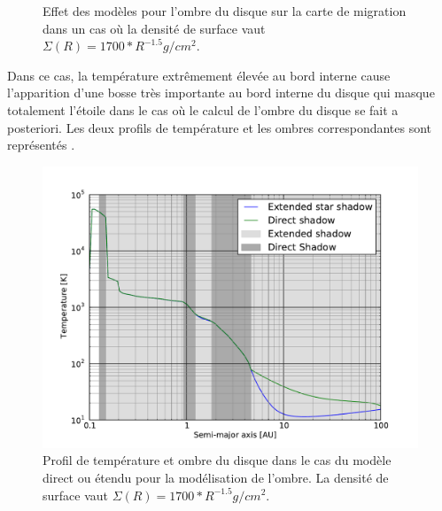 \begin{figure}[htbp]
\centering
{}\hfill
{}
\caption{Effet des modèles pour l'ombre du disque sur la carte de migration dans un cas où la densité de surface vaut $\Sigma(R) = 1700 * R^{-1.5}\unit{g/cm^2}$. }\label{fig:shadow-example}
\end{figure}

Dans ce cas, la température extrêmement élevée au bord interne cause l'apparition d'une bosse très importante au bord interne du disque qui masque totalement l'étoile dans le cas où le calcul de l'ombre du disque se fait a posteriori. Les deux profils de température et les ombres correspondantes sont représentés . 

\begin{figure}[htbp]
\centering
\includegraphics[width=0.65\linewidth]{figure/shadow/example_shadow_temp_profile.pdf}
\caption{Profil de température et ombre du disque dans le cas du modèle direct ou étendu pour la modélisation de l'ombre. La densité de surface vaut $\Sigma(R) = 1700 * R^{-1.5}\unit{g/cm^2}$. }\label{fig:example_shadow_temp_profile}
\end{figure}

